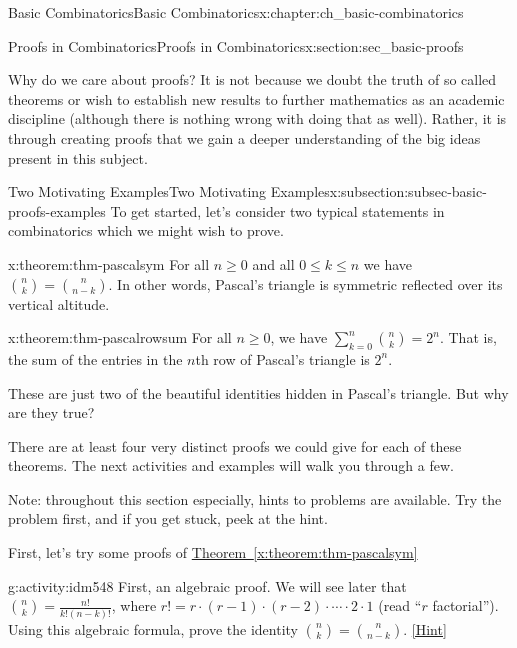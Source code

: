 \documentclass[oneside,10pt,]{book}
\numberwithin{equation}{chapter}
\begin{document}
\begin{chapterptx}{Basic Combinatorics}{}{Basic Combinatorics}{}{}{x:chapter:ch_basic-combinatorics}
\begin{sectionptx}{Proofs in Combinatorics}{}{Proofs in Combinatorics}{}{}{x:section:sec_basic-proofs}
\begin{introduction}{}
\par
Why do we care about proofs?  It is not because we doubt the truth of so called theorems or wish to establish new results to further mathematics as an academic discipline (although there is nothing wrong with doing that as well).  Rather, it is through creating proofs that we gain a deeper understanding of the big ideas present in this subject.%
\end{introduction}%
%
%
\typeout{************************************************}
\typeout{************************************************}
%
\begin{subsectionptx}{Two Motivating Examples}{}{Two Motivating Examples}{}{}{x:subsection:subsec-basic-proofs-examples}
To get started, let's consider two typical statements in combinatorics which we might wish to prove.%
\begin{theorem}{}{}{x:theorem:thm-pascalsym}%
For all \(n \ge 0\) and all \(0 \le k \le n\) we have \(\binom{n}{k} = \binom{n}{n-k}\).  In other words, Pascal's triangle is symmetric reflected over its vertical altitude.%
\end{theorem}
\begin{theorem}{}{}{x:theorem:thm-pascalrowsum}%
For all \(n \ge 0\), we have \(\sum_{k=0}^n \binom{n}{k} = 2^n\).  That is, the sum of the entries in the \(n\)th row of Pascal's triangle is \(2^n\).%
\end{theorem}
These are just two of the beautiful identities hidden in Pascal's triangle.  But why are they true?%
\par
There are at least four very distinct proofs we could give for each of these theorems.  The next activities and examples will walk you through a few.%
\par
Note: throughout this section especially, hints to problems are available.  Try the problem first, and if you get stuck, peek at the hint.%
\par
First, let's try some proofs of \hyperref[x:theorem:thm-pascalsym]{Theorem~\ref{x:theorem:thm-pascalsym}}%
\begin{activity}{}{g:activity:idm548}%
First, an algebraic proof.  We will see later that \(\binom{n}{k} = \frac{n!}{k!(n-k)!}\), where \(r! = r \cdot (r-1) \cdot (r-2) \cdot\cdots\cdot 2\cdot 1\) (read ``\(r\) factorial'').  Using this algebraic formula, prove the identity \(\binom{n}{k} = \binom{n}{n-k}\).%
\space\hspace*{0pt}\hfill{\tiny\hyperlink{g:hint:idm556-back}{[Hint]}}\end{activity}

\end{subsectionptx}
\end{sectionptx}
\end{chapterptx}
\end{document}
